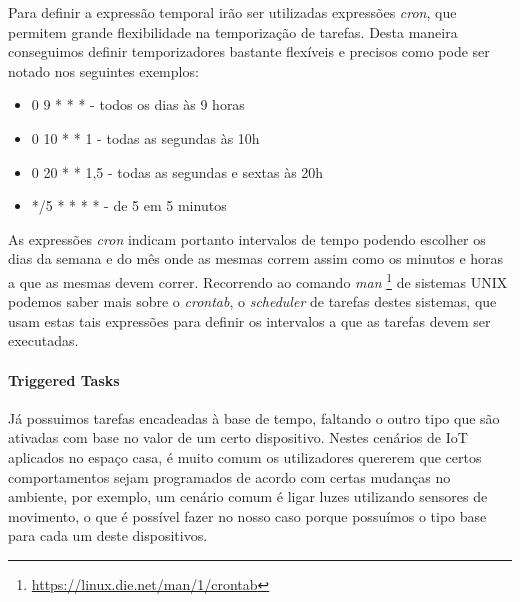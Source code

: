 Para definir a expressão temporal irão ser utilizadas expressões \textit{cron}, que permitem grande flexibilidade na temporização de tarefas. Desta maneira conseguimos definir temporizadores bastante flexíveis e precisos como pode ser notado nos seguintes exemplos:
\begin{itemize}
    \item 0 9 * * * - todos os dias às 9 horas
    \item 0 10 * * 1 - todas as segundas às 10h
    \item 0 20 * * 1,5 - todas as segundas e sextas às 20h
    \item */5 * * * * - de 5 em 5 minutos
\end{itemize}

As expressões \textit{cron} indicam portanto intervalos de tempo podendo escolher os dias da semana e do mês onde as mesmas correm assim como os minutos e horas a que as mesmas devem correr. Recorrendo ao comando \textit{man} \footnote{\url{https://linux.die.net/man/1/crontab}} de sistemas UNIX podemos saber mais sobre o \textit{crontab}, o \textit{scheduler} de tarefas destes sistemas, que usam estas tais expressões para definir os intervalos a que as tarefas devem ser executadas.

\paragraph*{Triggered Tasks}

Já possuimos tarefas encadeadas à base de tempo, faltando o outro tipo que são ativadas com base no valor de um certo dispositivo. Nestes cenários de IoT aplicados no espaço casa, é muito comum os utilizadores quererem que certos comportamentos sejam programados de acordo com certas mudanças no ambiente, por exemplo, um cenário comum é ligar luzes utilizando sensores de movimento, o que é possível fazer no nosso caso porque possuímos o tipo base para cada um deste dispositivos.

